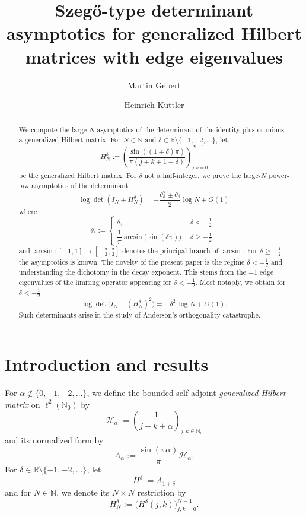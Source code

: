 \documentclass[11pt,a4paper,reqno]{amsart}
\title[Szeg\H{o}-type asymptotics for generalized Hilbert matrices]{Szeg\H{o}-type determinant asymptotics for generalized Hilbert matrices with edge eigenvalues}
\author{Martin Gebert}
\author{Heinrich K\"uttler}
\date{}
\theoremstyle{remark}
\newcommand{\Nzero}{\mathbb N_0}
\newcommand{\Hh}{\mathcal H}
\newcommand{\id}{I}
\begin{document}
\begin{abstract}
We compute the large-$N$ asymptotics of the determinant of the
identity plus or minus a generalized Hilbert matrix.
For $N \in \mathbb{N}$ and $\delta \in \mathbb{R} \setminus \{-1, -2,
  \ldots\}$, let
\[
  H_N^\delta
  := \left(
    \frac{\sin((1+\delta)\pi)}{\pi(j+k+1+\delta)}
  \right)_{j,k=0}^{N-1}
\]
be the generalized Hilbert matrix. For $\delta$ not a half-integer, we prove the large-$N$ power-law
asymptotics of the determinant
\[
  \log \det(\id_N \pm H_N^\delta) = -\frac{\theta_\delta^2 \pm \theta_\delta}{2} \log N + O(1)
\]
where
\[
  \theta_\delta :=
  \begin{cases}
    \delta, & \delta < -\frac{1}{2}, \\
    \dfrac{1}{\pi} \arcsin\bigl(\sin(\delta\pi)\bigr), & \delta \geq -\frac{1}{2},
  \end{cases}
\]
and $\arcsin \colon [-1,1] \to [-\frac{\pi}{2}, \frac{\pi}{2}]$ denotes the principal branch of $\arcsin$. For $\delta \geq -\frac 12$ the asymptotics is known. The novelty of the present paper is the regime $\delta < - \frac 12$ and understanding the dichotomy in the decay exponent. This stems from the $\pm 1$ edge eigenvalues of the limiting operator appearing for $\delta < - \frac 12$.
Most notably, we obtain for $\delta < -\frac 12$
\[
  \log \det\bigl(\id_N - (H_N^\delta)^2\bigr) = -\delta^2\, \log
  N + O(1).
\]
Such determinants arise in the study of Anderson's orthogonality catastrophe.
\end{abstract}

\maketitle

\section{Introduction and results}

For $\alpha\notin\{0,-1,-2,\ldots\}$, we define
the bounded self-adjoint \emph{generalized Hilbert matrix} on
$\ell^2(\Nzero)$ by
\begin{equation}\label{eq:Halpha}
 \Hh_\alpha:=\left(\frac1{j+k+\alpha}\right)_{j,k\in\Nzero}
\end{equation}
 and its normalized form by
\begin{equation}\label{eq:Aalpha}
 A_\alpha:=\frac{\sin(\pi\alpha)}\pi\Hh_\alpha.
\end{equation}
For $\delta\in\mathbb R \setminus \{-1,-2,\ldots\}$, let
\begin{equation}
 H^\delta := A_{1+\delta}
\end{equation}
and for $N\in\mathbb N$, we denote its $N\times N$ restriction by
\begin{equation}\label{eq:def-Hdelta}
 H_N^\delta
 :=
 \Big(H^\delta(j,k)\Big)_{j,k=0}^{N-1}.
\end{equation}
\end{document}
